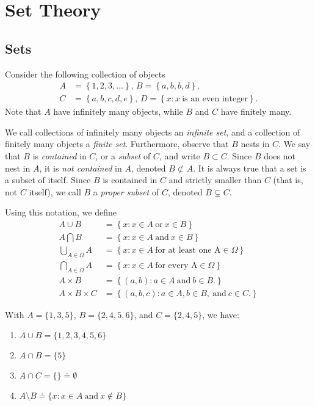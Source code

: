 \chapter{Set Theory}
\section{Sets}
Consider the following collection of objects
\begin{equation*}
\begin{split}
A & = \left\{ 1,2,3,\ldots \right\}, \,
B = \left\{ a, b, b, d \right\}, \,  \\
C & = \left\{ a,b,c,d,e \right\}, \,
D = \left\{ x: x \ \text{is an even integer} \right\}.
\end{split}
\end{equation*}
Note that $A$ have infinitely many objects, while $B$ and $C$ have finitely
many.
\begin{definition}
We call collections of infinitely many objects an \emph{infinite set}, and a
collection of finitely many objects a \emph{finite set}. Furthermore,
observe that $B$ nests in $C$. We say that $B$ is \emph{contained} in $C$,
or a \emph{subset} of $C$, and write $B \subset C$. Since $B$ does not nest
in $A$, it is \emph{not contained} in $A$, denoted $B \not \subset A$. It is
always true that a set is a subset of itself. Since $B$ is contained in $C$
and strictly smaller than $C$ (that is, not $C$ itself), we call $B$ a
\emph{proper subset} of $C$, denoted $B \subsetneq C$.

Using this notation, we define
\begin{equation*}
\begin{split}
A \cup B & = \left\{ x: x \in A \ \text{or} \ x \in B \right\} \\
A \bigcap B & = \left\{ x: x \in A \ \text{and} \ x \in B \right\} \\
\bigcup_{A \in \Omega} A & = \left\{ x: x \in A \ \text{for at least one A} \in \Omega
\right\} \\
\bigcap_{A \in \Omega} A & = \left\{ x: x \in A \ \text{for every A} \in \Omega \right\}
\\
A \times B & = \left\{ (a,b): a \in A \ \text{and} \ b \in B. \right\}
\\
A \times B \times C & = \left\{ (a,b,c): a \in A, b \in B,  \ \text{and} \ c \in C. \right\}
\end{split}
\end{equation*}
\end{definition}
\begin{example}
With $A = \{1,3,5\}$, $B  = \{2,4,5,6\}$,
and $C = \{2,4,5\}$, we have:
\begin{enumerate}
  \item $A \cup B = \{1,2,3,4,5,6\}$
  \item	$A \cap B = \{5\}$
 \item	$A \cap C  = \{\} \doteq \emptyset$
\item $A \setminus B  \doteq
\{ x: x \in A \ \text{and} \ x \not \in B\} $
\end{enumerate}
\end{example}
